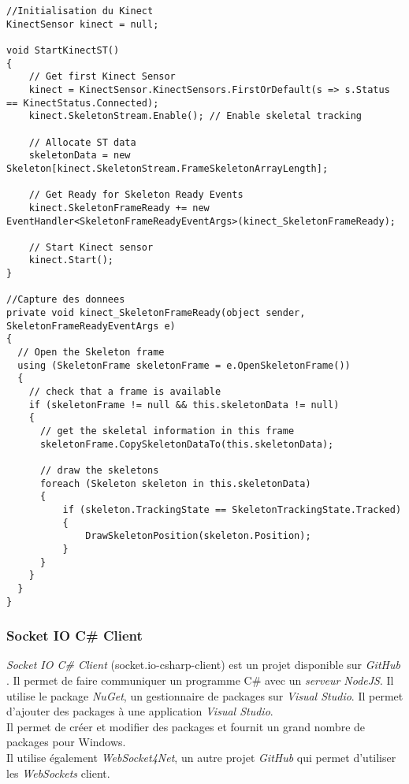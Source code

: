 \begin{lstlisting}
//Initialisation du Kinect
KinectSensor kinect = null;

void StartKinectST()
{
	// Get first Kinect Sensor
	kinect = KinectSensor.KinectSensors.FirstOrDefault(s => s.Status == KinectStatus.Connected); 
	kinect.SkeletonStream.Enable(); // Enable skeletal tracking
	
	// Allocate ST data
	skeletonData = new Skeleton[kinect.SkeletonStream.FrameSkeletonArrayLength]; 

	// Get Ready for Skeleton Ready Events
	kinect.SkeletonFrameReady += new EventHandler<SkeletonFrameReadyEventArgs>(kinect_SkeletonFrameReady); 

	// Start Kinect sensor
	kinect.Start(); 
}

//Capture des donnees
private void kinect_SkeletonFrameReady(object sender, SkeletonFrameReadyEventArgs e)
{
  // Open the Skeleton frame
  using (SkeletonFrame skeletonFrame = e.OpenSkeletonFrame()) 
  {
  	// check that a frame is available
	if (skeletonFrame != null && this.skeletonData != null) 
	{
	  // get the skeletal information in this frame
	  skeletonFrame.CopySkeletonDataTo(this.skeletonData);
	  
	  // draw the skeletons
	  foreach (Skeleton skeleton in this.skeletonData)
      {
          if (skeleton.TrackingState == SkeletonTrackingState.Tracked)
          {
              DrawSkeletonPosition(skeleton.Position);
          }
      } 
	}
  }
}

\end{lstlisting}

\subsubsection{Socket IO C\# Client}
\textit{Socket IO C\# Client} (socket.io-csharp-client) est un projet disponible sur \textit{GitHub} \cite{SocketIOCSharp}. Il permet de faire communiquer un programme C\# avec un \textit{serveur NodeJS}. Il utilise le \textsf{package} \textit{NuGet}, un gestionnaire de \textsf{packages} sur \textit{Visual Studio}. Il permet d'ajouter des \textsf{packages} à une application \textit{Visual Studio}. \\
Il permet de créer et modifier des \textsf{packages} et fournit un grand nombre de \textsf{packages} pour Windows. \\
Il utilise également \textit{WebSocket4Net}, un autre projet \textit{GitHub} \cite{WebSocket4Net} qui permet d'utiliser les \textit{WebSockets} client.\\

